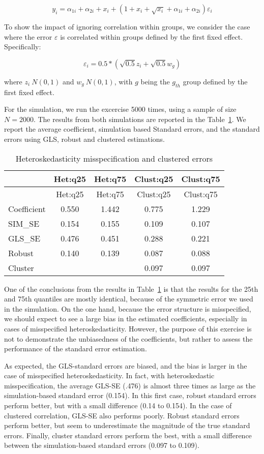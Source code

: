 \documentclass[
  authoryear,
  review,
  1p]{elsarticle}
\begin{document}
\[y_i = \alpha_{1i} + \alpha_{2i} + x_i + (1+x_i + \sqrt{x_i} +\alpha_{1i} + \alpha_{2i} ) \varepsilon_i
\]

To show the impact of ignoring correlation within groups, we consider
the case where the error \(\varepsilon\) is correlated within groups
defined by the first fixed effect. Specifically:

\[\varepsilon_i =0.5*(\sqrt{0.5} z_i + \sqrt{0.5} w_g)\]

where \(z_i~N(0,1)\) and \(w_g~N(0,1)\), with \(g\) being the \(g_{th}\)
group defined by the first fixed effect.

For the simulation, we run the excercise 5000 times, using a sample of
size \(N=2000\). The results from both simulations are reported in the
Table~\ref{tbl-sim2}. We report the average coefficient, simulation
based Standard errors, and the standard errors using GLS, robust and
clustered estimations.

\begin{longtable}[]{@{}lcccc@{}}
\caption{Heteroskedasticity misspecification and clustered
errors}\label{tbl-sim2}\tabularnewline
\toprule\noalign{}
& Het:q25 & Het:q75 & Clust:q25 & Clust:q75 \\
\midrule\noalign{}
\endfirsthead
\toprule\noalign{}
& Het:q25 & Het:q75 & Clust:q25 & Clust:q75 \\
\midrule\noalign{}
\endhead
\bottomrule\noalign{}
\endlastfoot
Coefficient & 0.550 & 1.442 & 0.775 & 1.229 \\
SIM\_SE & 0.154 & 0.155 & 0.109 & 0.107 \\
GLS\_SE & 0.476 & 0.451 & 0.288 & 0.221 \\
Robust & 0.140 & 0.139 & 0.087 & 0.088 \\
Cluster & & & 0.097 & 0.097 \\
\end{longtable}

One of the conclusions from the results in Table~\ref{tbl-sim2} is that
the results for the 25th and 75th quantiles are mostly identical,
because of the symmetric error we used in the simulation. On the one
hand, because the error structure is misspecified, we should expect to
see a large bias in the estimated coefficients, especially in cases of
misspecified heteroskedasticity. However, the purpose of this exercise
is not to demonstrate the unbiasedness of the coefficients, but rather
to assess the performance of the standard error estimation.

As expected, the GLS-standard errors are biased, and the bias is larger
in the case of misspecified heteroskedasticity. In fact, with
heteroskedastic misspecification, the average GLS-SE (.476) is almost
three times as large as the simulation-based standard error (0.154). In
this first case, robust standard errors perform better, but with a small
difference (0.14 to 0.154). In the case of clustered correlation, GLS-SE
also performs poorly. Robust standard errors perform better, but seem to
underestimate the magnitude of the true standard errors. Finally,
cluster standard errors perform the best, with a small difference
between the simulation-based standard errors (0.097 to 0.109).
\end{document}
